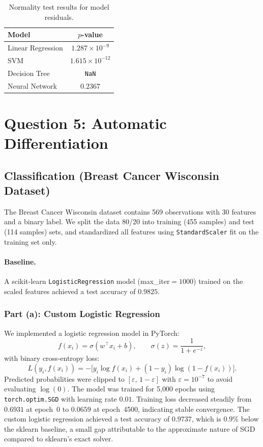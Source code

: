 \documentclass[11pt]{article}
\begin{document}
\begin{table}[h]
    \centering
    \caption{Normality test results for model residuals.}
    \label{tab:normality}
    \begin{tabular}{lc}
        \toprule
        \textbf{Model} & \textbf{$p$-value} \\
        \midrule
        Linear Regression & $1.287 \times 10^{-9}$  \\
        SVM               & $1.615 \times 10^{-12}$ \\
        Decision Tree     & \texttt{NaN}            \\
        Neural Network    & $0.2367$                \\
        \bottomrule
    \end{tabular}
\end{table}

\section*{Question 5: Automatic Differentiation}

\subsection*{Classification (Breast Cancer Wisconsin Dataset)}

The Breast Cancer Wisconsin dataset contains 569 observations with 30 features
and a binary label. We split the data 80/20 into training (455 samples) and
test (114 samples) sets, and standardized all features using
\texttt{StandardScaler} fit on the training set only.

\paragraph{Baseline.}
A scikit-learn \texttt{LogisticRegression} model (max\_iter$=1000$) trained on
the scaled features achieved a test accuracy of $\mathbf{0.9825}$.

\subsubsection*{Part (a): Custom Logistic Regression}

We implemented a logistic regression model in PyTorch:
\[
    f(x_i) = \sigma(w^\top x_i + b),
    \qquad
    \sigma(z) = \frac{1}{1 + e^{-z}},
\]
with binary cross-entropy loss:
\[
    L(y_i, f(x_i)) = -\bigl[y_i \log f(x_i) + (1-y_i)\log(1-f(x_i))\bigr].
\]
Predicted probabilities were clipped to $[\varepsilon,\, 1-\varepsilon]$ with
$\varepsilon = 10^{-7}$ to avoid evaluating $\log(0)$. The model was trained
for 5{,}000 epochs using \texttt{torch.optim.SGD} with learning rate $0.01$.
Training loss decreased steadily from $0.6931$ at epoch~0 to $0.0659$ at
epoch~4500, indicating stable convergence. The custom logistic regression
achieved a test accuracy of $\mathbf{0.9737}$, which is $0.9\%$ below the
sklearn baseline, a small gap attributable to the approximate nature of SGD
compared to sklearn's exact solver.
\end{document}
